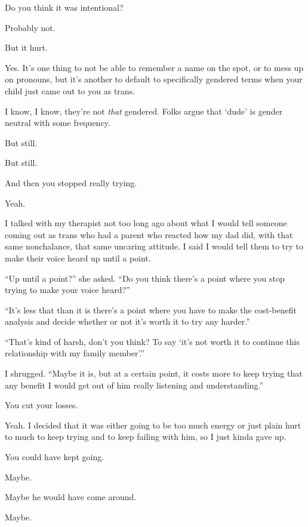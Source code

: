 \begin{paracol}{2}
\begin{leftcolumn}
\begin{ally}
Do you think it was intentional?
\end{ally}
Probably not.

\begin{ally}
But it hurt.
\end{ally}
Yes. It's one thing to not be able to remember a name on the spot, or to mess up on pronouns, but it's another to default to specifically gendered terms when your child just came out to you as trans.

I know, I know, they're not \emph{that} gendered. Folks argue that `dude' is gender neutral with some frequency.

\begin{ally}
But still.
\end{ally}
But still.

\begin{ally}
And then you stopped really trying.
\end{ally}
Yeah.

I talked with my therapist not too long ago about what I would tell someone coming out as trans who had a parent who reacted how my dad did, with that same nonchalance, that same uncaring attitude. I said I would tell them to try to make their voice heard up until a point.

``Up until a point?'' she asked. ``Do you think there's a point where you stop trying to make your voice heard?''

``It's less that than it is there's a point where you have to make the cost-benefit analysis and decide whether or not it's worth it to try any harder.''

``That's kind of harsh, don't you think? To say `it's not worth it to continue this relationship with my family member'.''

I shrugged. ``Maybe it is, but at a certain point, it costs more to keep trying that any benefit I would get out of him really listening and understanding.''

\begin{ally}
You cut your losses.
\end{ally}
Yeah. I decided that it was either going to be too much energy or just plain hurt to much to keep trying and to keep failing with him, so I just kinda gave up.

\begin{ally}
You could have kept going.
\end{ally}
Maybe.

\begin{ally}
Maybe he would have come around.
\end{ally}
Maybe.


\end{leftcolumn}
\end{paracol}
